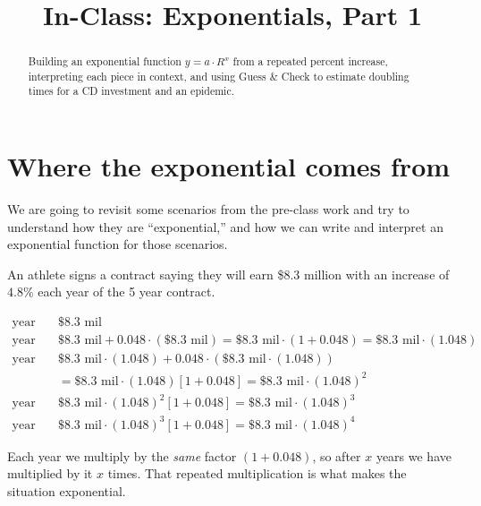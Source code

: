 \documentclass[12pt]{ximera}
\title{In-Class: Exponentials, Part 1}
\begin{document}
\begin{abstract}
Building an exponential function $y = a \cdot R^x$ from a repeated percent increase,
interpreting each piece in context, and using Guess \& Check to estimate doubling
times for a CD investment and an epidemic.
\end{abstract}
\maketitle

\section*{Where the exponential comes from}

We are going to revisit some scenarios from the pre-class work and try to understand
how they are ``exponential,'' and how we can write and interpret an exponential
function for those scenarios.

\begin{example}
An athlete signs a contract saying they will earn \$8.3 million with an increase of
$4.8\%$ each year of the 5 year contract.

\[
\begin{aligned}
\text{year 0:} \quad & \$8.3 \text{ mil} \\
\text{year 1:} \quad & \$8.3 \text{ mil} + 0.048 \cdot (\$8.3 \text{ mil})
  = \$8.3 \text{ mil} \cdot (1 + 0.048) = \$8.3 \text{ mil} \cdot (1.048) \\
\text{year 2:} \quad & \$8.3 \text{ mil} \cdot (1.048) + 0.048 \cdot \left(\$8.3 \text{ mil} \cdot (1.048)\right) \\
  &= \$8.3 \text{ mil} \cdot (1.048)\left[1 + 0.048\right] = \$8.3 \text{ mil} \cdot (1.048)^2 \\
\text{year 3:} \quad & \$8.3 \text{ mil} \cdot (1.048)^2 \left[1 + 0.048\right] = \$8.3 \text{ mil} \cdot (1.048)^3 \\
\text{year 4:} \quad & \$8.3 \text{ mil} \cdot (1.048)^3 \left[1 + 0.048\right] = \$8.3 \text{ mil} \cdot (1.048)^4
\end{aligned}
\]

Each year we multiply by the \emph{same} factor $(1 + 0.048)$, so after $x$ years we
have multiplied by it $x$ times. That repeated multiplication is what makes the
situation exponential.
\end{example}
\end{document}
